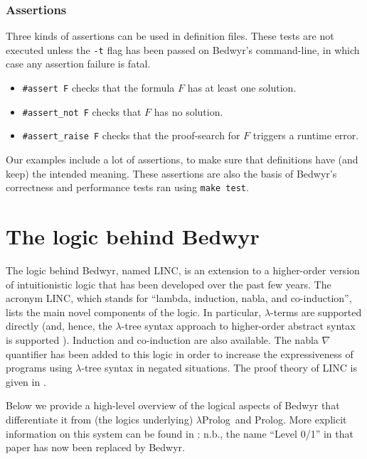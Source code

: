 \documentclass{article}
\newcommand{\lp}{$\lambda$Prolog}
\begin{document}
\subsubsection{Assertions}

Three kinds of assertions can be used in definition files.
These tests are not executed unless the \verb.-t. flag has been passed
on Bedwyr's command-line, in which case any assertion failure is fatal.
\begin{itemize}
\item
\verb.#assert F. checks that the formula $F$ has at least one solution.
\item
\verb.#assert_not F. checks that $F$ has no solution.
\item
\verb.#assert_raise F. checks that the proof-search for $F$ triggers
a runtime error.
\end{itemize}

Our examples include a lot of assertions, to make sure that definitions have
(and keep) the intended meaning. These assertions are also the basis of
Bedwyr's correctness and performance tests ran using \verb.make test..

\section{The logic behind Bedwyr}
\label{logic}

The logic behind Bedwyr, named LINC, is an extension to a higher-order
version of intuitionistic logic that has been developed over the past
few years.  The acronym LINC, which stands for ``lambda, induction,
nabla, and co-induction'', lists the main novel components of the
logic.  In particular, $\lambda$-terms are supported directly (and,
hence, the $\lambda$-tree syntax approach to higher-order abstract
syntax is supported \cite{miller00cl}).  Induction and co-induction
are also available.  The nabla $\nabla$ quantifier has been added to
this logic in order to increase the expressiveness of programs using
$\lambda$-tree syntax in negated situations.  The proof theory of LINC
is given in \cite{miller05tocl,tiu04phd}.

Below we provide a high-level overview of the
logical aspects of Bedwyr that differentiate it from (the logics
underlying) \lp\ and Prolog.  More explicit information on this system
can be found in \cite{tiu05eshol}: n.b., the name ``Level 0/1'' in
that paper has now been replaced by Bedwyr.
\end{document}
